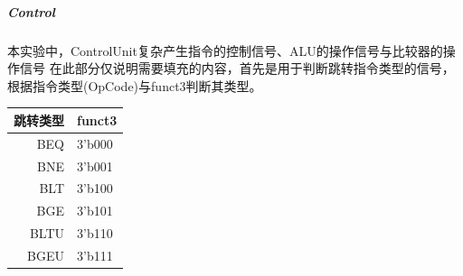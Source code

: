\subparagraph{Control}
本实验中，ControlUnit复杂产生指令的控制信号、ALU的操作信号与比较器的操作信号
在此部分仅说明需要填充的内容，首先是用于判断跳转指令类型的信号，根据指令类型(OpCode)与funct3判断其类型。

\begin{tabular}{|r|l|}
    \hline
    跳转类型 & funct3 \\
    \hline 
    BEQ & 3'b000 \\
    \hline
    BNE & 3'b001 \\
    \hline
    BLT & 3'b100 \\
    \hline
    BGE & 3'b101 \\
    \hline
    BLTU & 3'b110 \\
    \hline
    BGEU & 3'b111 \\
    \hline
\end{tabular} \\


